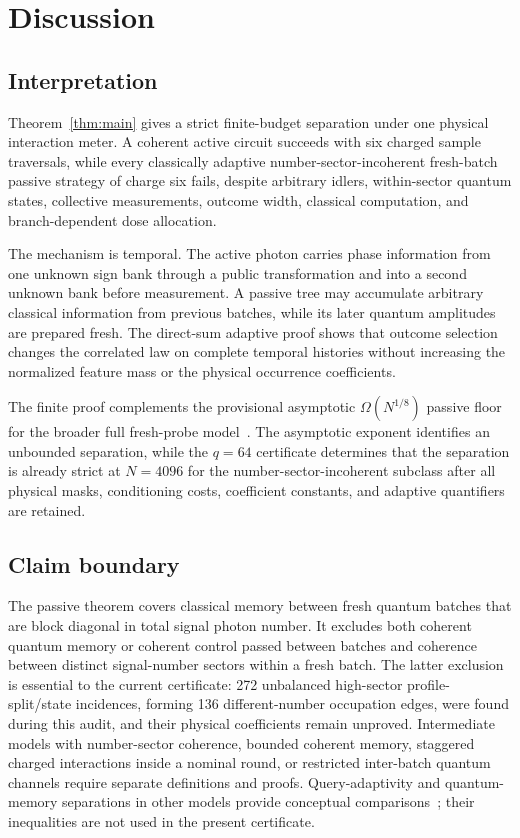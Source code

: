 \section{Discussion}
\label{sec:discussion}

\subsection{Interpretation}

Theorem~\ref{thm:main} gives a strict finite-budget separation under one physical interaction meter. A coherent active circuit succeeds with six charged sample traversals, while every classically adaptive number-sector-incoherent fresh-batch passive strategy of charge six fails, despite arbitrary idlers, within-sector quantum states, collective measurements, outcome width, classical computation, and branch-dependent dose allocation.

The mechanism is temporal. The active photon carries phase information from one unknown sign bank through a public transformation and into a second unknown bank before measurement. A passive tree may accumulate arbitrary classical information from previous batches, while its later quantum amplitudes are prepared fresh. The direct-sum adaptive proof shows that outcome selection changes the correlated law on complete temporal histories without increasing the normalized feature mass or the physical occurrence coefficients.

The finite proof complements the provisional asymptotic $\Omega(N^{1/8})$ passive floor for the broader full fresh-probe model~\cite{SafaviNaeini2026}. The asymptotic exponent identifies an unbounded separation, while the $q=64$ certificate determines that the separation is already strict at $N=4096$ for the number-sector-incoherent subclass after all physical masks, conditioning costs, coefficient constants, and adaptive quantifiers are retained.

\subsection{Claim boundary}

The passive theorem covers classical memory between fresh quantum batches that are block diagonal in total signal photon number. It excludes both coherent quantum memory or coherent control passed between batches and coherence between distinct signal-number sectors within a fresh batch. The latter exclusion is essential to the current certificate: 272 unbalanced high-sector profile-split/state incidences, forming 136 different-number occupation edges, were found during this audit, and their physical coefficients remain unproved. Intermediate models with number-sector coherence, bounded coherent memory, staggered charged interactions inside a nominal round, or restricted inter-batch quantum channels require separate definitions and proofs. Query-adaptivity and quantum-memory separations in other models provide conceptual comparisons~\cite{GirishEtAl2024,AharonovCotlerQi2022,ChenEtAl2022}; their inequalities are not used in the present certificate.

